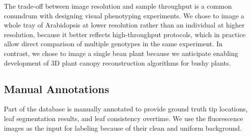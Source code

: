 
The trade-off between image resolution and sample throughput is a common conundrum with designing visual phenotyping experiments. 
We chose to image a whole tray of Arabidopsis at lower resolution rather than an individual at higher resolution, because it better reflects high-throughput protocols, which in practice allow direct comparison of multiple genotypes in the same experiment.
In contrast, we chose to image a single bean plant because we anticipate enabling development of $3$D plant canopy reconstruction algorithms for bushy plants.


\subsection{Manual Annotations}
\label{sec:annotation}
Part of the database is manually annotated to provide ground truth tip locations, leaf segmentation results, and leaf consistency overtime.
We use the fluorescence images as the input for labeling because of their clean and uniform background.

